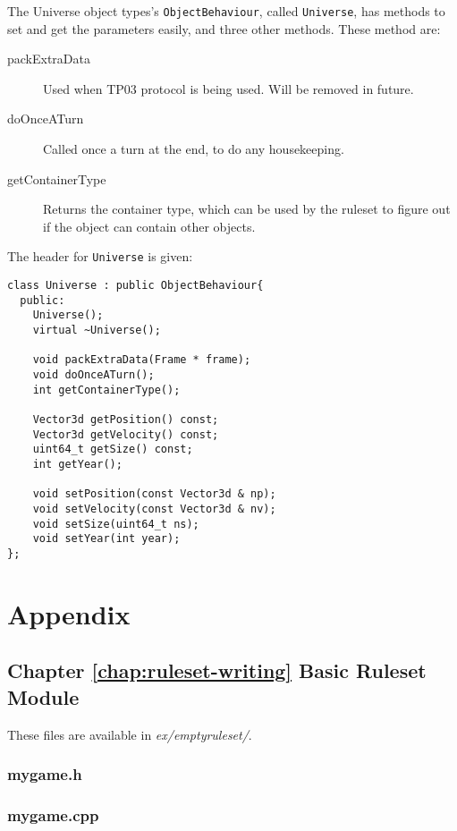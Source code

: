 \documentclass[a4paper,11pt]{report}
\newcommand{\filename}[1]{\emph{#1}}
\newcommand{\codename}[1]{\texttt{#1}}
\begin{document}
The Universe object types's \codename{ObjectBehaviour}, called \codename{Universe}, has methods to set and get the parameters easily, and three other methods. These method are:
\begin{description}
 \item[packExtraData] Used when TP03 protocol is being used. Will be removed in future.
\item[doOnceATurn] Called once a turn at the end, to do any housekeeping.
\item[getContainerType] Returns the container type, which can be used by the ruleset to figure out if the object can contain other objects.
 \end{description}

The header for \codename{Universe} is given:

\begin{verbatim}
class Universe : public ObjectBehaviour{
  public:
    Universe();
    virtual ~Universe();

    void packExtraData(Frame * frame);
    void doOnceATurn();
    int getContainerType();

    Vector3d getPosition() const;
    Vector3d getVelocity() const;
    uint64_t getSize() const;
    int getYear();

    void setPosition(const Vector3d & np);
    void setVelocity(const Vector3d & nv);
    void setSize(uint64_t ns);
    void setYear(int year);
};
\end{verbatim}



\appendix
\part{Appendix}
\label{part:appendix}

\chapter{Chapter \ref{chap:ruleset-writing} Basic Ruleset Module}
\label{apx:emptyruleset_ex}

These files are available in \filename{ex/emptyruleset/}.

\section{mygame.h}


\section{mygame.cpp}

\end{document}
